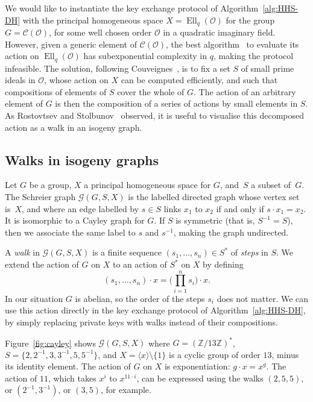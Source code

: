 \documentclass{llncs}
\newcommand{\Cl}{\mathcal{C}}
\newcommand{\Graph}{\mathcal{G}}
\renewcommand{\O}{\mathcal{O}}
\DeclareMathOperator{\Ell}{Ell}
\begin{document}
We would like to instantiate the key exchange protocol of
Algorithm~\ref{alg:HHS-DH} with the principal homogeneous space
$X = \Ell_q(\O)$ for the group $G = \Cl(\O)$, 
for some well chosen order $\O$ in a quadratic imaginary field. 
However, given a generic element of $\Cl(\O)$, 
the best algorithm~\cite{jao+soukharev10} to evaluate
its action on $\Ell_q(\O)$ has subexponential complexity in $q$,
making the protocol infeasible. 
The solution,
following Couveignes~\cite{cryptoeprint:2006:291},
is to fix a set $S$ of small prime ideals in $\O$,
whose action on $X$ can be computed efficiently,
and such that compositions of elements of $S$
cover the whole of $G$.
The action of an arbitrary element of $G$
is then the composition of a series of actions by small elements in $S$.
As Rostovtsev and Stolbunov~\cite{rostovtsev+stolbunov06} observed,
it is useful to visualise this decomposed action
as a walk in an isogeny graph.


\subsection{Walks in isogeny graphs}

Let $G$ be a group,
$X$ a principal homogeneous space for $G$,
and~$S$ a subset of~$G$.
The Schreier graph $\Graph(G,S,X)$
is the labelled directed graph whose vertex set is~$X$, 
and where an edge labelled by $s∈S$
links $x_1$ to $x_2$ if and only if $s\cdot x_1 = x_2$.
It is isomorphic to a Cayley graph for $G$.
If $S$ is symmetric (that is, $S^{-1}=S$), 
then we associate the same label to $s$ and $s^{-1}$, 
making the graph undirected.

A \emph{walk} in $\Graph(G,S,X)$ is a finite sequence
$(s_1,\ldots,s_n) ∈ S^*$ of \emph{steps} in $S$. 
We extend the action of $G$ on $X$ to an action of $S^*$ on $X$ by defining
\[
    (s_1,\ldots,s_n)·x 
    = 
    \big(\prod_{i=1}^n s_i\big)·x.
\]
In our situation $G$ is abelian,
so the order of the steps $s_i$ does not matter.
We can use this action directly in the key exchange protocol
of Algorithm~\ref{alg:HHS-DH},
by simply replacing private keys with walks instead of their compositions.

Figure~\ref{fig:cayley}
shows $\Graph(G,S,X)$ where $G=(ℤ/13ℤ)^*$, 
$S = \{2,2^{-1},3,3^{-1},5,5^{-1}\}$,
and $X = \langle{x}\rangle\setminus\{1\}$ 
is a cyclic group of order $13$, minus its identity element.
The action of $G$ on $X$ is exponentiation: $g·x=x^g$.
The action of $11$, which takes $x^i$ to $x^{11\cdot i}$,
can be expressed using the walks 
$(2,5,5)$,
or $(2^{-1},3^{-1})$,
or $(3,5)$,
for example.
\end{document}
